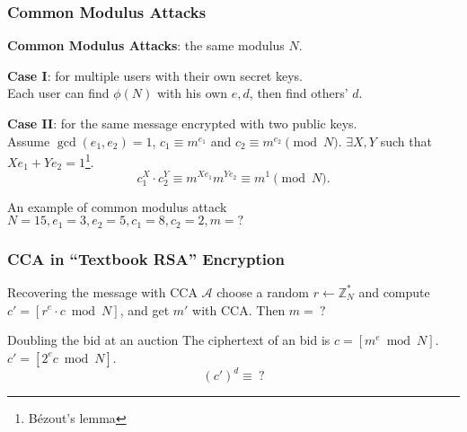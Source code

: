 \begin{frame}\frametitle{Common Modulus Attacks}
\textbf{Common Modulus Attacks}: the same modulus $N$.
\newline

\textbf{Case I}: for multiple users with their own secret keys.\\
Each user can find $\phi(N)$ with his own $e,d$, then find others' $d$.
\newline

\textbf{Case II}: for the same message encrypted with two public keys.\\
Assume $\gcd(e_1,e_2)=1$, $c_1 \equiv m^{e_1}$ and $c_2 \equiv m^{e_2} \pmod N$. $\exists X,Y$ such that $Xe_1 + Ye_2 = 1$\footnote{B\'{e}zout's lemma}.
\[ c_1^X\cdot c_2^Y \equiv m^{Xe_1}m^{Ye_2} \equiv m^1 \pmod N.\]
\begin{exampleblock}{An example of common modulus attack}
$N = 15, e_{1} = 3, e_{2} = 5, c_{1} = 8, c_{2} = 2, m = ?$ 
\end{exampleblock}
\end{frame}
\begin{frame}\frametitle{CCA in ``Textbook RSA'' Encryption}
\begin{exampleblock}{Recovering the message with CCA}
$\mathcal{A}$ choose a random $r \gets \mathbb{Z}^*_N$ and compute $c' = [r^e\cdot c \bmod N]$, and get $m'$ with CCA. Then $m=\ ?$%
\end{exampleblock}
\begin{exampleblock}{Doubling the bid at an auction}
The ciphertext of an bid is $c = [m^e \bmod N]$. $c'= [2^ec \bmod N]$.
\[(c')^d \equiv\ ? \]%
\end{exampleblock}
\end{frame}
